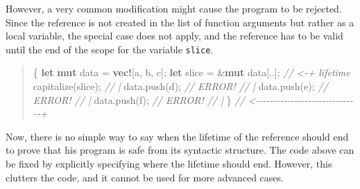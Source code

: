 \documentclass[
  11pt,
  twoside,symmetric]{report}
\newenvironment{Shaded}{}{}
\newcommand{\CharTok}[1]{#1}
\newcommand{\CommentTok}[1]{\textit{#1}}
\newcommand{\KeywordTok}[1]{\textbf{#1}}
\newcommand{\NormalTok}[1]{#1}
\newcommand{\OperatorTok}[1]{#1}
\newcommand{\PreprocessorTok}[1]{\textbf{#1}}
\begin{document}
However, a very common modification might cause the program to be
rejected. Since the reference is not created in the list of function
arguments but rather as a local variable, the special case does not
apply, and the reference has to be valid until the end of the scope for
the variable \texttt{slice}.

\begin{quote}
\begin{Shaded}
\begin{Highlighting}[]
\OperatorTok{\{}
    \KeywordTok{let} \KeywordTok{mut}\NormalTok{ data }\OperatorTok{=} \PreprocessorTok{vec!}\NormalTok{[}\CharTok{\textquotesingle{}a\textquotesingle{}}\OperatorTok{,} \CharTok{\textquotesingle{}b\textquotesingle{}}\OperatorTok{,} \CharTok{\textquotesingle{}c\textquotesingle{}}\NormalTok{]}\OperatorTok{;}
    \KeywordTok{let}\NormalTok{ slice }\OperatorTok{=} \OperatorTok{\&}\KeywordTok{mut}\NormalTok{ data[}\OperatorTok{..}\NormalTok{]}\OperatorTok{;} \CommentTok{// \textless{}{-}+ \textquotesingle{}lifetime}
\NormalTok{    capitalize(slice)}\OperatorTok{;}         \CommentTok{//   |}
\NormalTok{    data}\OperatorTok{.}\NormalTok{push(}\CharTok{\textquotesingle{}d\textquotesingle{}}\NormalTok{)}\OperatorTok{;} \CommentTok{// ERROR!  //   |}
\NormalTok{    data}\OperatorTok{.}\NormalTok{push(}\CharTok{\textquotesingle{}e\textquotesingle{}}\NormalTok{)}\OperatorTok{;} \CommentTok{// ERROR!  //   |}
\NormalTok{    data}\OperatorTok{.}\NormalTok{push(}\CharTok{\textquotesingle{}f\textquotesingle{}}\NormalTok{)}\OperatorTok{;} \CommentTok{// ERROR!  //   |}
\OperatorTok{\}} \CommentTok{// \textless{}{-}{-}{-}{-}{-}{-}{-}{-}{-}{-}{-}{-}{-}{-}{-}{-}{-}{-}{-}{-}{-}{-}{-}{-}{-}{-}{-}{-}{-}{-}+}
\end{Highlighting}
\end{Shaded}
\end{quote}

Now, there is no simple way to say when the lifetime of the reference
should end to prove that his program is safe from its syntactic
structure. The code above can be fixed by explicitly specifying where
the lifetime should end. However, this clutters the code, and it cannot
be used for more advanced cases.
\end{document}
